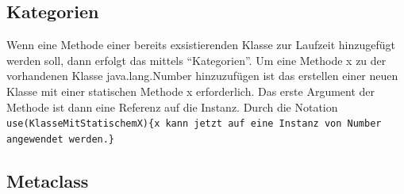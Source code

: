 \documentclass[11pt,english,ngerman, headsepline]{scrreprt}
\begin{document}
\subsection{Kategorien}

Wenn eine Methode einer bereits exsistierenden Klasse zur Laufzeit hinzugefügt
werden soll, dann erfolgt das mittels ``Kategorien''.
Um eine Methode x zu der vorhandenen Klasse java.lang.Number hinzuzufügen ist
das erstellen einer neuen Klasse mit einer statischen Methode x erforderlich.
Das erste Argument der Methode ist dann eine Referenz auf die Instanz.
Durch die Notation \texttt{use(KlasseMitStatischemX)\{x kann jetzt auf eine
Instanz von Number angewendet werden.\}}





 \subsection{Metaclass}\label{Metaclass}
 
\end{document}
